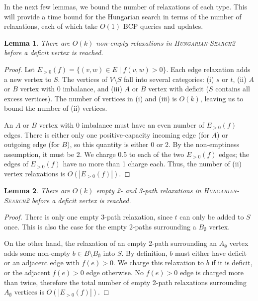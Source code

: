 \documentclass[11pt]{article}
\def\eps{\varepsilon}
\theoremstyle{plain}
\newtheorem{lemma}{Lemma}
\begin{document}
\begin{figure*}




In the next few lemmas, we bound the number of relaxations of each type.
This will provide a time bound for the Hungarian search in terms of the
number of relaxations, each of which take $O(1)$ BCP queries and updates.

\begin{lemma}
\label{lemma:goldberg_hs_length1}
	There are $O(k)$ non-empty relaxations in \textsc{Hungarian-Search2}
	before a deficit vertex is reached.
\end{lemma}
\begin{proof}
	Let $E_{>0}(f) = \{(v, w) \in E \mid f(v, w) > 0\}$.
	Each edge relaxation adds a new vertex to $S$.
	The vertices of $V \setminus S$ fall into several categories:
	(i) $s$ or $t$, (ii) $A$ or $B$ vertex with 0 imbalance, and (iii) $A$
	or $B$ vertex with deficit ($S$ contains all excess vertices).
	The number of vertices in (i) and (iii) is $O(k)$, leaving us to bound
	the number of (ii) vertices.

	An $A$ or $B$ vertex with 0 imbalance must have an even number of
	$E_{>0}(f)$ edges.
	There is either only one positive-capacity incoming edge (for $A$) or
	outgoing edge (for $B$), so this quantity is either 0 or 2.
	By the non-emptiness assumption, it must be 2.
	We charge 0.5 to each of the two $E_{>0}(f)$ edges;
	the edges of $E_{>0}(f)$ have no more than 1 charge each.
	Thus, the number of (ii) vertex relaxations is $O(|E_{>0}(f)|)$.
\end{proof}

\begin{lemma}
\label{lemma:goldberg_hs_length2}
	There are $O(k)$ empty 2- and 3-path relaxations in
	\textsc{Hungarian-Search2} before a deficit vertex is reached.
\end{lemma}
\begin{proof}
	There is only one empty 3-path relaxation, since $t$ can only be added
	to $S$ once.
	This is also the case for the empty 2-paths surrounding a $B_\emptyset$
	vertex.

	On the other hand, the relaxation of an empty 2-path surrounding an
	$A_\emptyset$ vertex adds some non-empty
	$b \in B \setminus B_\emptyset$ into $S$.
	By definition, $b$ must either have deficit or an adjacent edge with
	$f(e) > 0$.
	We charge this relaxation to $b$ if it is deficit, or the adjacent
	$f(e) > 0$ edge otherwise.
	No $f(e) > 0$ edge is charged more than twice, therefore the total
	number of empty 2-path relaxations surrounding $A_\emptyset$ vertices
	is $O(|E_{>0}(f)|)$.
\end{proof}




\end{figure*}
\end{document}
